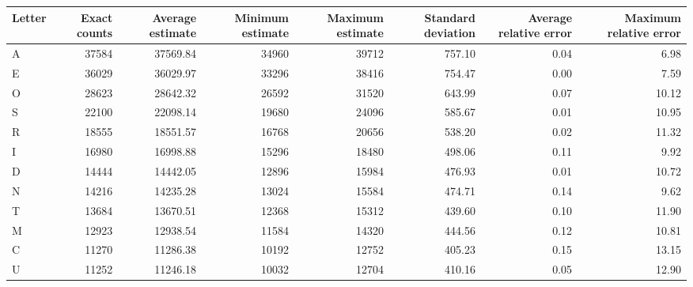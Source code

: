 \begin{tabular}{lrrrrrrr}
\toprule
Letter &  Exact counts &  Average estimate &  Minimum estimate &  Maximum estimate &  Standard deviation &  Average relative error &  Maximum relative error \\
\midrule
     A &         37584 &          37569.84 &             34960 &             39712 &              757.10 &                    0.04 &                    6.98 \\
     E &         36029 &          36029.97 &             33296 &             38416 &              754.47 &                    0.00 &                    7.59 \\
     O &         28623 &          28642.32 &             26592 &             31520 &              643.99 &                    0.07 &                   10.12 \\
     S &         22100 &          22098.14 &             19680 &             24096 &              585.67 &                    0.01 &                   10.95 \\
     R &         18555 &          18551.57 &             16768 &             20656 &              538.20 &                    0.02 &                   11.32 \\
     I &         16980 &          16998.88 &             15296 &             18480 &              498.06 &                    0.11 &                    9.92 \\
     D &         14444 &          14442.05 &             12896 &             15984 &              476.93 &                    0.01 &                   10.72 \\
     N &         14216 &          14235.28 &             13024 &             15584 &              474.71 &                    0.14 &                    9.62 \\
     T &         13684 &          13670.51 &             12368 &             15312 &              439.60 &                    0.10 &                   11.90 \\
     M &         12923 &          12938.54 &             11584 &             14320 &              444.56 &                    0.12 &                   10.81 \\
     C &         11270 &          11286.38 &             10192 &             12752 &              405.23 &                    0.15 &                   13.15 \\
     U &         11252 &          11246.18 &             10032 &             12704 &              410.16 &                    0.05 &                   12.90 \\

\end{tabular}

